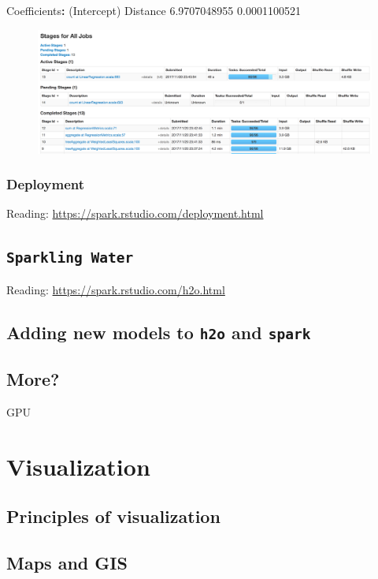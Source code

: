 \documentclass[]{book}
\newenvironment{Shaded}{\begin{snugshade}}{\end{snugshade}}
\newcommand{\FloatTok}[1]{\textcolor[rgb]{0.00,0.00,0.81}{#1}}
\newcommand{\StringTok}[1]{\textcolor[rgb]{0.31,0.60,0.02}{#1}}
\newcommand{\OperatorTok}[1]{\textcolor[rgb]{0.81,0.36,0.00}{\textbf{#1}}}
\newcommand{\NormalTok}[1]{#1}
\theoremstyle{definition}
\theoremstyle{definition}
\theoremstyle{definition}
\theoremstyle{remark}
\begin{document}
\begin{Shaded}
\begin{Highlighting}[]
\NormalTok{Coefficients}\OperatorTok{:}
\StringTok{ }\NormalTok{(Intercept)     Distance }
\FloatTok{6.9707048955} \FloatTok{0.0001100521}
\end{Highlighting}
\end{Shaded}

\begin{figure}

{\centering \includegraphics[width=39.44in]{images/ch6_spark_jobs} 

}

\end{figure}

\subsection{Deployment}\label{deployment}

Reading: \url{https://spark.rstudio.com/deployment.html}

\section{\texorpdfstring{\texttt{Sparkling\ Water}}{Sparkling Water}}\label{sparkling-water}

Reading: \url{https://spark.rstudio.com/h2o.html}

\section{\texorpdfstring{Adding new models to \texttt{h2o} and
\texttt{spark}}{Adding new models to h2o and spark}}\label{adding-new-models-to-h2o-and-spark}

\section{More?}\label{more}

GPU

\chapter{Visualization}\label{visualization}

\section{Principles of visualization}\label{principles-of-visualization}

\section{Maps and GIS}\label{maps-and-gis}


\end{document}
